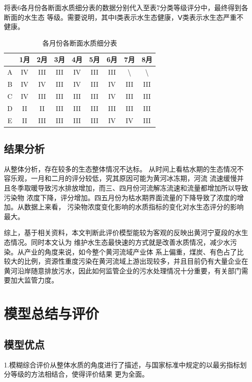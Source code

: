 \documentclass{whutmod}
\begin{document}
\begin{spacing}{1.2}
将表6各月份各断面水质细分表的数据分别代入至表7分类等级评分中，最终得到各断面的水生态
等级。需要说明，其中Ⅰ类表示水生态健康，Ⅴ类表示水生态严重不健康。

  \begin{table}[H]
	\centering
	\caption{各月份各断面水质细分表}
	  \begin{tabular}{ccccccccc}\toprule[1.5pt]
        & 1月  & 2月  & 3月  & 4月  & 5月  & 6月  & 7月  & 8月 \\ \hline
		A   & IV  & III & III & IV  & III & III & \textbackslash{} & \textbackslash{} \\
		B   & IV  & IV  & III & IV  & III & IV  & III & III \\
		C   & IV  & III & III & III & III & IV  & III & III \\
		D   & II  & II  & III & III & III & III & III & III \\
		E   & II  & III & III & III & III & IV  & IV  & III \\ \bottomrule[1.5pt]
    \end{tabular}%
	\label{得分}%
  \end{table}%
	



\subsection{结果分析}
	
从整体分析，存在较多的生态整体情况不达标。
从时间上看枯水期的生态情况不容乐观，一月和二月的评分较低，究其原因可能为黄河冰冻期，河流
流速缓慢并且冬季取暖导致污水排放增加，而三、四月份河流解冻流速和流量都增加所以导致污染物
浓度下降，评分增加。四五月份为枯水期界面流量的下降导致了浓度的增加。从数据上来看，
污染物浓度变化影响的水质指标的变化对水生态评分的影响最大。


综上，基于相关资料，本文判断此评价模型能较为客观的反映出黄河宁夏段的水生态情况。同时本文认为
维护水生态最快速的方式就是改善水质情况，减少水污染。从产业的角度来说，如今整个黄河流域产业体
系上偏重，煤炭、有色占了比较大的比例，资源性重度污染在黄河流域上游出现较多，并且目前仍有大量企业在
黄河沿岸随意排放污水，因此如何监管企业的污水处理情况十分重要，有关部门需要加大监管力度。

\section{模型总结与评价}


\subsection{模型优点}
1.模糊综合评价从整体水质的角度进行了描述，与国家标准中规定的以最劣指标划分等级的方法相结合，使得评价结果
更为全面。


\end{spacing}
\end{document}
